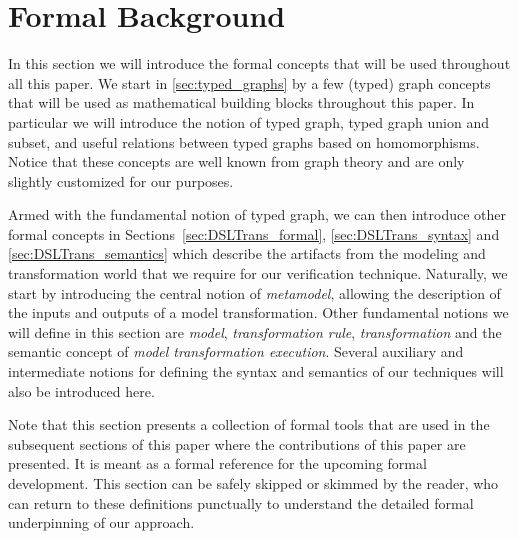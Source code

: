 \section{Formal Background}
\label{sec:formal_background}

In this section we will introduce the formal concepts that will be used throughout all this paper. We start in \cref{sec:typed_graphs} by a few (typed) graph concepts that will be used as mathematical building blocks throughout this paper. In particular we will introduce the notion of typed graph, typed graph union and subset, and useful relations between typed graphs based on homomorphisms. Notice that these concepts are well known from graph theory and are only slightly customized for our purposes.

Armed with the fundamental notion of typed graph, we can then introduce other formal concepts in Sections~\ref{sec:DSLTrans_formal}, \ref{sec:DSLTrans_syntax} and \ref{sec:DSLTrans_semantics} which describe the artifacts from the modeling and transformation world that we require for our verification technique. Naturally, we start by introducing the central notion of \emph{metamodel}, allowing the description of the inputs and outputs of a model transformation. Other fundamental notions we will define in this section are \emph{model}, \emph{transformation rule}, \emph{transformation} and the semantic concept of \emph{model transformation execution}. Several auxiliary and intermediate notions for defining the syntax and semantics of our techniques will also be introduced here. 

Note that this section presents a collection of formal tools that are used in the subsequent sections of this paper where the contributions of this paper are presented. It is meant as a formal reference for the upcoming formal development. This section can be safely skipped or skimmed by the reader, who can return to these definitions punctually to understand the detailed formal underpinning of our approach. 

    
